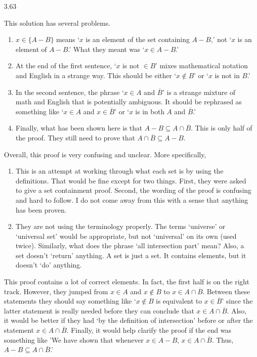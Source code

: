 \begin{Answer}{3.63}
\begin{pfevalenum}
\item
This solution has several problems.
\begin{enumerate}
\item
$x\in \{A-B\}$ means `$x$ is an element of the set containing $A-B$,' not
`$x$ is an element of $A-B$.'  What they meant was `$x\in A-B$.'
\item
At the end of the first sentence, `$x$ is not $\in B$' mixes mathematical
notation and English in a strange way.
This should be either `$x\not\in B$' or `$x$ is not in $B$.'
\item
In the second sentence,
the phrase  `$x\in A$ and $\overline{B}$' is a strange mixture of math and English
that is potentially ambiguous.  It should be rephrased as something like
`$x\in A$ and $x\in\overline{B}$' or `$x$ is in both $A$ and $\overline{B}$.'
\item
Finally, what has been shown here is that $A-B\subseteq A\cap\overline{B}$.
This is only half of the proof.  They still need to prove that
$A\cap\overline{B}\subseteq A-B$.
\end{enumerate}
\item
Overall, this proof is very confusing and unclear.  More specifically,
\begin{enumerate}
\item
This is an attempt at working through what each set is by using the definitions.
That would be fine except for two things.
First, they were asked to give a set containment proof.
Second, the wording of the proof is confusing and hard to follow.
I do not come away from this with a sense that anything has been proven.
\item
They are not using the terminology properly. The terms `universe' or `universal set' would be appropriate, but not `universal' on its own (used twice).  Similarly, what does the phrase
`all intersection part' mean?
Also, a set doesn't `return' anything.  A set is just a set. It contains elements, but
it doesn't `do' anything.
\end{enumerate}
\item
This proof contains a lot of correct elements.  In fact, the first half is on the right track.
However, they jumped from $x\in A$ and $x\not\in B$ to $x\in A\cap\overline{B}$.  Between
these statements they should say something like
`$x\not\in B$ is equivalent to $x\in\overline{B}$' since the latter statement is really needed
before they can conclude that $x\in A\cap\overline{B}$.
Also, it would be better if they had `by the definition of intersection'
before or after the statement $x\in A\cap\overline{B}$.
Finally, it would help clarify the proof if the end was something like
'We have shown that whenever $x\in A-B$, $x\in A\cap\overline{B}$.  Thus, $A-B\subseteq A\cap\overline{B}$.'


\end{pfevalenum}
\end{Answer}
